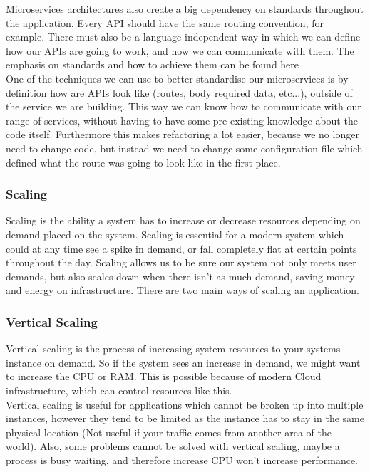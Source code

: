 \documentclass[titlepage]{article}
\begin{document}
Microservices architectures also create a big dependency on standards throughout the application. Every API should have the same routing convention, for example. There must also be a language independent way in which we can define how our APIs are going to work, and how we can communicate with them. The emphasis on standards and how to achieve them can be found here ~\cite{microservices_talk} \\

One of the techniques we can use to better standardise our microservices is by definition how are APIs look like (routes, body required data, etc...), outside of the service we are building. This way we can know how to communicate with our range of services, without having to have some pre-existing knowledge about the code itself. Furthermore this makes refactoring a lot easier, because we no longer need to change code, but instead we need to change some configuration file which defined what the route was going to look like in the first place.

\subsubsection{Scaling}
Scaling is the ability a system has to increase or decrease resources depending on demand placed on the system. Scaling is essential for a modern system which could at any time see a spike in demand, or fall completely flat at certain points throughout the day. Scaling allows us to be sure our system not only meets user demands, but also scales down when there isn't as much demand, saving money and energy on infrastructure. There are two main ways of scaling an application.

\subsubsection{Vertical Scaling}
Vertical scaling is the process of increasing system resources to your systems instance on demand. So if the system sees an increase in demand, we might want to increase the CPU or RAM. This is possible because of modern Cloud infrastructure, which can control resources like this. \\

Vertical scaling is useful for applications which cannot be broken up into multiple instances, however they tend to be limited as the instance has to stay in the same physical location (Not useful if your traffic comes from another area of the world). Also, some problems cannot be solved with vertical scaling, maybe a process is busy waiting, and therefore increase CPU won't increase performance.
\end{document}
